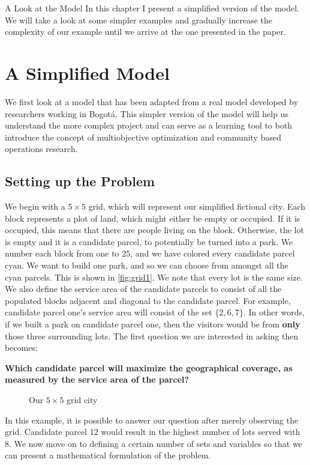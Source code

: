 \documentclass[12pt]{pom_thesis}
\theoremstyle{definition}
\begin{document}
%
%
%
%
\begin{chapter}{A Look at the Model}
In this chapter I present a simplified version of the model. We will take a look at some simpler examples and gradually increase the complexity of our example until we arrive at the one presented in the paper. 
%
%
\section{A Simplified Model} 
We first look at a model that has been adapted from a real model developed by researchers working in Bogot\'{a}. This simpler version of the model will help us understand the more complex project and can serve as a learning tool to both introduce the concept of multiobjective optimization and community based operations research.
%
%
\subsection{Setting up the Problem} \label{setting-up-problem}

We begin with a $5\times5$ grid, which will represent our simplified fictional city. Each block represents a plot of land, which might either be empty or occupied. If it is occupied, this means that there are people living on the block. Otherwise, the lot is empty and it is a candidate parcel, to potentially be turned into a park. We number each block from one to $25$, and we have colored every candidate parcel cyan. We want to build one park, and so we can choose from amongst all the cyan parcels. This is shown in \autoref{fig:grid1}. We note that every lot is the same size. We also define the service area of the candidate parcels to consist of all the populated blocks adjacent and diagonal to the candidate parcel. For example, candidate parcel one's service area will consist of the set $\{2,6,7\}$. In other words, if we built a park on candidate parcel one, then the visitors would be from \textbf{only} those three surrounding lots. The first question we are interested in asking then becomes: 
\begin{center}
\textbf{Which candidate parcel will maximize the geographical coverage, as measured by the service area of the parcel?}
\end{center}
\begin{figure}
 \centering
 \caption{Our $5\times 5$ grid city}
 \label{fig:grid1}
\end{figure}
In this example, it is possible to answer our question after merely observing the grid. Candidate parcel 12 would result in the highest number of lots served with 8. We now move on to defining a certain number of sets and variables so that we can present a mathematical formulation of the problem. \newline 
	

\end{chapter}
\end{document}
